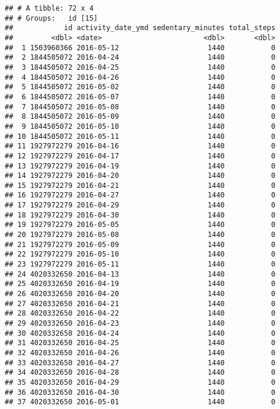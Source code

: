 \documentclass[
]{article}
\begin{document}
\begin{verbatim}
## # A tibble: 72 x 4
## # Groups:   id [15]
##            id activity_date_ymd sedentary_minutes total_steps
##         <dbl> <date>                        <dbl>       <dbl>
##  1 1503960366 2016-05-12                     1440           0
##  2 1844505072 2016-04-24                     1440           0
##  3 1844505072 2016-04-25                     1440           0
##  4 1844505072 2016-04-26                     1440           0
##  5 1844505072 2016-05-02                     1440           0
##  6 1844505072 2016-05-07                     1440           0
##  7 1844505072 2016-05-08                     1440           0
##  8 1844505072 2016-05-09                     1440           0
##  9 1844505072 2016-05-10                     1440           0
## 10 1844505072 2016-05-11                     1440           0
## 11 1927972279 2016-04-16                     1440           0
## 12 1927972279 2016-04-17                     1440           0
## 13 1927972279 2016-04-19                     1440           0
## 14 1927972279 2016-04-20                     1440           0
## 15 1927972279 2016-04-21                     1440           0
## 16 1927972279 2016-04-27                     1440           0
## 17 1927972279 2016-04-29                     1440           0
## 18 1927972279 2016-04-30                     1440           0
## 19 1927972279 2016-05-05                     1440           0
## 20 1927972279 2016-05-08                     1440           0
## 21 1927972279 2016-05-09                     1440           0
## 22 1927972279 2016-05-10                     1440           0
## 23 1927972279 2016-05-11                     1440           0
## 24 4020332650 2016-04-13                     1440           0
## 25 4020332650 2016-04-19                     1440           0
## 26 4020332650 2016-04-20                     1440           0
## 27 4020332650 2016-04-21                     1440           0
## 28 4020332650 2016-04-22                     1440           0
## 29 4020332650 2016-04-23                     1440           0
## 30 4020332650 2016-04-24                     1440           0
## 31 4020332650 2016-04-25                     1440           0
## 32 4020332650 2016-04-26                     1440           0
## 33 4020332650 2016-04-27                     1440           0
## 34 4020332650 2016-04-28                     1440           0
## 35 4020332650 2016-04-29                     1440           0
## 36 4020332650 2016-04-30                     1440           0
## 37 4020332650 2016-05-01                     1440           0

\end{verbatim}
\end{document}
